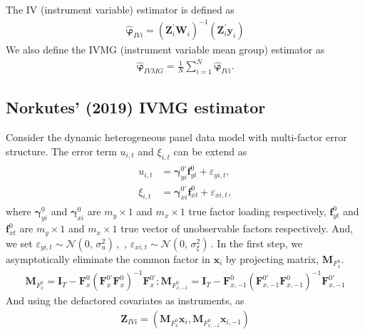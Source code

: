 \documentclass[12pt,a4paper,hyperref]{article}
\begin{document}
The IV (instrument variable) estimator is defined as
\begin{align}
\boldsymbol{\hat{\varphi}}_{IVi}=\left(\boldsymbol{Z}^{'}_{i}\boldsymbol{W}_{i}  \right)^{-1}\left(\boldsymbol{Z}^{'}_{i}\boldsymbol{y}_{i}  \right)
\end{align}
 We also define the IVMG (instrument variable mean group) estimator as
\begin{align}
\boldsymbol{\hat{\varphi}}_{IVMG}=\frac{1}{N}\sum^{N}_{i=1}\boldsymbol{\hat{\varphi}}_{IVi}.
\end{align}



\subsection{Norkutes' (2019) IVMG estimator}
Consider the dynamic heterogeneous panel data model with multi-factor error structure. The error term $u_{i,t}$ and $\xi_{i,t}$ can be extend as
\begin{align}
\begin{split}
u_{i,t}&=\boldsymbol{\gamma}^{0'}_{yi}\boldsymbol{f}^{0}_{yt}+\varepsilon_{yi,t}, \\
\xi_{i,t}&=\boldsymbol{\gamma}^{0'}_{xi}\boldsymbol{f}^{0}_{xt}+\varepsilon_{xi,t},
\end{split}
\end{align}
where $\boldsymbol{\gamma}^{0}_{yi}$ and $\boldsymbol{\gamma}^{0}_{xi}$ are $m_{y}\times 1$ and $m_{x}\times 1$ true
 factor loading respectively, $\boldsymbol{f}^{0}_{yt}$  and  $\boldsymbol{f}^{0}_{xt}$ are  $m_{y}\times 1$ and $m_{x}\times 1$ true vector of unobservable factors respectively. And, we set  $\varepsilon_{yi,t}\sim \mathcal{N}(0,\,\sigma_{u}^{2})\,,$ , $\varepsilon_{xi,t}\sim \mathcal{N}(0,\,\sigma_{\xi}^{2})\,.$
 In the first step, we asymptotically eliminate the common factor in $\boldsymbol{x}_{i}$ by projecting matrix, $\boldsymbol{M}_{F^{0}_{x}}$.
 \begin{align}
 \boldsymbol{M}_{F^{0}_{x}}=\boldsymbol{I}_{T}-\boldsymbol{F}^{0}_{x}\left(\boldsymbol{F}^{0'}_{x}\boldsymbol{F}^{0}_{x}  \right)^{-1}\boldsymbol{F}^{0'}_{x} ; \boldsymbol{M}_{F^{0}_{x,-1}}=\boldsymbol{I}_{T}-\boldsymbol{F}^{0}_{x,-1}\left(\boldsymbol{F}^{0'}_{x,-1}\boldsymbol{F}^{0}_{x,-1}  \right)^{-1}\boldsymbol{F}^{0'}_{x,-1}
 \end{align}
And using the defactored covariates as instruments, as
\begin{align}
\boldsymbol{Z}_{IVi}=\left(\boldsymbol{M}_{F^{0}_{x}}\boldsymbol{x}_{i}, \boldsymbol{M}_{F^{0}_{x,-1}}\boldsymbol{x}_{i,-1}  \right)
\end{align}
\end{document}

